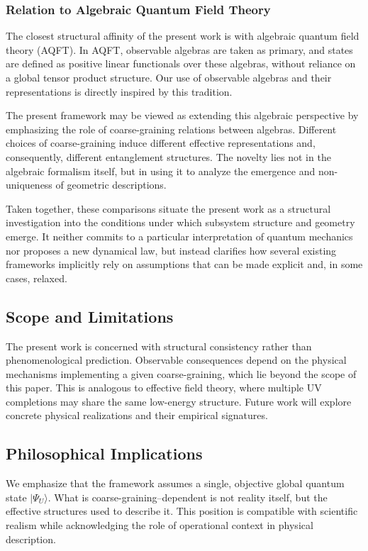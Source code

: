 \documentclass[12pt,a4paper]{article}
\begin{document}
\subsubsection{Relation to Algebraic Quantum Field Theory}

The closest structural affinity of the present work is with algebraic quantum field theory (AQFT).
In AQFT, observable algebras are taken as primary, and states are defined as positive linear functionals over these algebras, without reliance on a global tensor product structure.
Our use of observable algebras and their representations is directly inspired by this tradition.

The present framework may be viewed as extending this algebraic perspective by emphasizing the role of coarse-graining relations between algebras.
Different choices of coarse-graining induce different effective representations and, consequently, different entanglement structures.
The novelty lies not in the algebraic formalism itself, but in using it to analyze the emergence and non-uniqueness of geometric descriptions.

Taken together, these comparisons situate the present work as a structural investigation into the conditions under which subsystem structure and geometry emerge.
It neither commits to a particular interpretation of quantum mechanics nor proposes a new dynamical law, but instead clarifies how several existing frameworks implicitly rely on assumptions that can be made explicit and, in some cases, relaxed.

\subsection{Scope and Limitations}

The present work is concerned with structural consistency rather than phenomenological prediction. 
Observable consequences depend on the physical mechanisms implementing a given coarse-graining, which lie beyond the scope of this paper. 
This is analogous to effective field theory, where multiple UV completions may share the same low-energy structure. 
Future work will explore concrete physical realizations and their empirical signatures.

\subsection{Philosophical Implications}

We emphasize that the framework assumes a single, objective global quantum state $|\Psi_U\rangle$. 
What is coarse-graining--dependent is not reality itself, but the effective structures used to describe it. 
This position is compatible with scientific realism while acknowledging the role of operational context in physical description.
\end{document}
